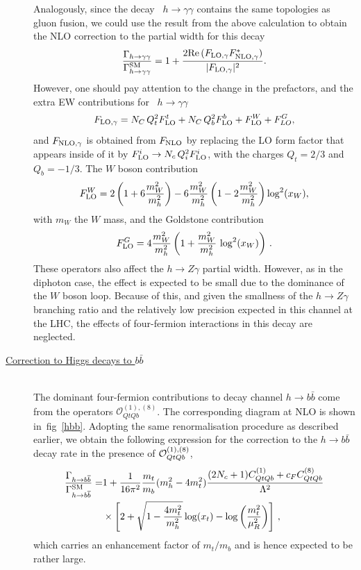 \begin{description}
	Analogously, since the decay ~$ h \to \gamma \gamma$ contains the same topologies as gluon fusion, we could use the result from the above calculation to obtain the NLO correction to the partial width for this decay
	\begin{equation}
		\frac{\Gamma_{h\to \gamma\gamma}}{\Gamma_{h\to \gamma\gamma}^{\mathrm{SM}}}= 1+ \frac{2 \mbox{Re}\,(F_{\textrm{LO}, \gamma} F^*_{\textrm{NLO},\gamma})}{  |F_{\textrm{LO}, \gamma}|^2} .
	\end{equation}
	However, one should pay attention to the change in the prefactors, and the extra EW contributions for ~$ h \to \gamma \gamma$ 
	\begin{equation}
		F_{\textrm{LO}, \gamma}= N_C\,Q_t^2 F_{\textrm{LO}}^t+ N_C\,Q_b^2 F_{\textrm{LO}}^b+F_{\textrm{LO}}^W+ F^G_{LO} ,
	\end{equation}
	and $F_{\textrm{NLO}, \gamma}$ is obtained from $F_{\textrm{NLO}}$ by replacing the LO form factor that appears inside of it by  $ F_{\textrm{LO}}^i \to N_c \,Q_i^2 F_{\textrm{LO}}^i$,
	with the charges $Q_t=2/3$ and $Q_b=-1/3$. The $W$ boson contribution
	\begin{equation}
		F_{\textrm{LO}}^W= 2 \left(1+6 \frac{m_W^2}{m_h^2}\right)-6 \frac{m_W^2}{  m_h^2} \left(1-2  \frac{m_W^2}{m_h^2}\right) \log^2(x_W),
	\end{equation}
	with $m_W$ the $W$ mass, and the Goldstone contribution
	\begin{equation}
		F_{\textrm{LO}}^G=4\frac{m_W^2}{m_h^2} \left( 1+ \frac{m_W^2}{m_h^2} \,\log^2(x_W) \right)\,.
	\end{equation}
These operators also affect the $h\to Z\gamma$ partial width. However, as in the diphoton case, the effect is expected to be small due to the dominance of the $W$ boson loop. Because of this, and given the smallness of the $h\to Z\gamma$ branching ratio and the relatively low precision expected in this channel at the LHC, the effects of four-fermion interactions in this decay are neglected.
\item [\underline{Correction to Higgs decays to $b \bar{b}$ }] \hfill  \vspace{0.3cm} \\
The dominant four-fermion contributions to decay channel $h \to b\bar b$ come from the operators  $\mathcal{O}_{QtQb}^{(1),(8)}$. The corresponding diagram at NLO is shown in~fig~\ref{hbb}. 
Adopting the same renormalisation procedure as described earlier, we obtain the following expression for the correction to 
the $h \to b\bar b$ decay rate in the presence of ${\cal O}_{QtQb}^{(1),(8)}$,
\begin{equation}
	\begin{split}
		\frac{\Gamma_{h\to b\overline{b}}}{\Gamma_{h\to b\overline{b}}^{\mathrm{SM}}}=& 1+ \frac{1}{16\pi^2}\frac{m_t}{m_b}(m_h^2-4m_t^2)\frac{(2 N_c+1) C_{QtQb}^{(1)}+c_F C_{QtQb}^{(8)}}{\Lambda^2} \\ & \times\left[ 2+\sqrt{1-\frac{4 m_t^2}{m_h^2}}\log(x_t)-\log\left(\frac{m_t^2}{\mu_R^2}\right) \right] \,,
		\label{hbbnlo}
	\end{split}
\end{equation}
which carries an enhancement factor of $m_t/m_b$ and is hence expected to be rather large.
\end{description}
